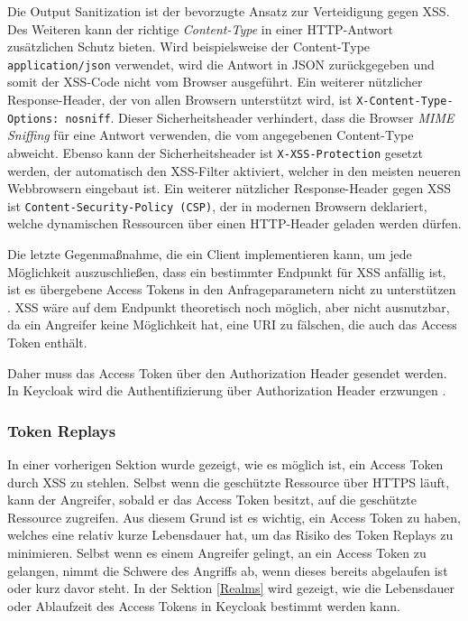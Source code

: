 Die Output Sanitization ist der bevorzugte Ansatz zur Verteidigung gegen XSS. Des Weiteren kann der richtige \textit{Content-Type} in einer HTTP-Antwort zusätzlichen Schutz bieten. Wird beispielsweise der Content-Type \texttt{application/json} verwendet, wird die Antwort in JSON zurückgegeben und somit der XSS-Code nicht vom Browser ausgeführt. Ein weiterer nützlicher Response-Header, der von allen Browsern unterstützt wird, ist \texttt{X-Content-Type-Options: nosniff}. Dieser Sicherheitsheader verhindert, dass die Browser \textit{MIME Sniffing} für eine Antwort verwenden, die vom angegebenen Content-Type abweicht. Ebenso kann der Sicherheitsheader ist \texttt{X-XSS-Protection} gesetzt werden, der automatisch den XSS-Filter aktiviert, welcher in den meisten neueren Webbrowsern eingebaut ist. Ein weiterer nützlicher Response-Header gegen XSS ist \texttt{Content-Security-Policy (CSP)}, der in modernen Browsern deklariert, welche dynamischen Ressourcen über einen HTTP-Header geladen werden dürfen.

Die letzte Gegenmaßnahme, die ein Client implementieren kann, um jede Möglichkeit auszuschließen, dass ein bestimmter Endpunkt für XSS anfällig ist, ist es übergebene Access Tokens in den Anfrageparametern nicht zu unterstützen \cite{OAuth2inAction}. XSS wäre auf dem Endpunkt theoretisch noch möglich, aber nicht ausnutzbar, da ein Angreifer keine Möglichkeit hat, eine URI zu fälschen, die auch das Access Token  enthält\cite{OAuth2inAction}. 

Daher muss das Access Token über den Authorization Header gesendet werden. In Keycloak wird die Authentifizierung über Authorization Header erzwungen \cite{keycloakDocs}.


\subsubsection{Token Replays}

In einer vorherigen Sektion wurde gezeigt, wie es möglich ist, ein Access Token durch XSS zu stehlen. Selbst wenn die geschützte Ressource über HTTPS läuft, kann der Angreifer, sobald er das Access Token besitzt, auf die geschützte Ressource zugreifen. Aus diesem Grund ist es wichtig, ein Access Token zu haben, welches eine relativ kurze Lebensdauer hat, um das Risiko des Token Replays zu minimieren. Selbst wenn es einem Angreifer gelingt, an ein Access Token zu gelangen, nimmt die Schwere des Angriffs ab, wenn dieses bereits abgelaufen ist oder kurz davor steht. In der Sektion \ref{Realms} wird gezeigt, wie die Lebensdauer oder Ablaufzeit des Access Tokens in Keycloak bestimmt werden kann.

